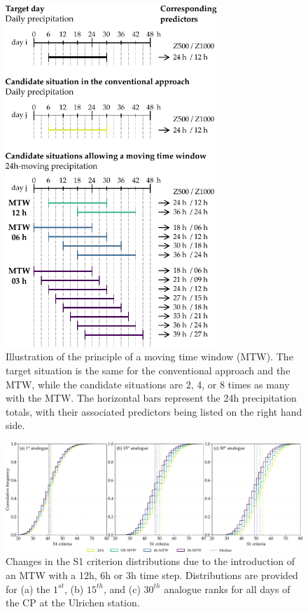 \documentclass[hess, manuscript]{copernicus}
\begin{document}
	\begin{figure}[htb]
		\begin{center}
			\includegraphics[width=8cm]{fig02.pdf}
		\end{center}
		\caption{Illustration of the principle of a moving time window (MTW). The target situation is the same for the conventional approach and the MTW, while the candidate situations are 2, 4, or 8 times as many with the MTW. The horizontal bars represent the 24h precipitation totals, with their associated predictors being listed on the right hand side.}
		\label{fig:principle}
	\end{figure}
	
	\begin{figure}[htb]
		\begin{center}
			\includegraphics[width=17cm]{fig03.pdf}
		\end{center}
		\caption{Changes in the S1 criterion distributions due to the introduction of an MTW with a 12h, 6h or 3h time step. Distributions are provided for (a) the $1^{st}$, (b) $15^{th}$, and (c) $30^{th}$ analogue ranks for all days of the CP at the Ulrichen station.}
		\label{fig:changes_S1_analogs}
	\end{figure}
	
\end{document}
